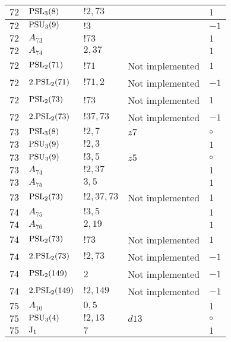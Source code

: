 \documentclass[a4paper, 11pt]{article}
\begin{document}
\begin{longtable}{lllll}
        $ 72 $ & $ {\rm PSL}_{3}(8) $ & $ ! 2,73 $ & $ ~ $ & $ 1$ \\ \hline
        $ 72 $ & $ {\rm PSU}_{3}(9) $ & $ ! 3 $ & $ ~ $ & $ -1$ \\ \hline
        $ 72 $ & $ A_{73} $ & $ !73 $ & $ ~ $ & $ 1$ \\ \hline
        $ 72 $ & $ A_{74} $ & $ 2, 37 $ & $ ~ $ & $ 1$ \\ \hline
        $ 72 $ & $ {\rm PSL}_{2}(71) $ & $ !71 $ &  Not implemented & $ 1$ \\ \hline
        $ 72 $ & $ 2.{\rm PSL}_{2}(71) $ & $ !71, 2 $ &  Not implemented & $ -1$ \\ \hline
        $ 72 $ & $ {\rm PSL}_{2}(73) $ & $ !73 $ &  Not implemented & $ 1$ \\ \hline
        $ 72 $ & $ 2.{\rm PSL}_{2}(73) $ & $ !37, 73 $ &  Not implemented & $ -1$ \\ \hline
        $ 73 $ & $ {\rm PSL}_{3}(8) $ & $ ! 2,7 $ & $ z7 $ &  $\circ$ \\ \hline
        $ 73 $ & $ {\rm PSU}_{3}(9) $ & $ ! 2,3 $ & $ ~ $ & $ 1$ \\ \hline
        $ 73 $ & $ {\rm PSU}_{3}(9) $ & $ ! 3,5 $ & $ z5 $ &  $\circ$ \\ \hline
        $ 73 $ & $ A_{74} $ & $ !2, 37 $ & $ ~ $ & $ 1$ \\ \hline
        $ 73 $ & $ A_{75} $ & $ 3, 5 $ & $ ~ $ & $ 1$ \\ \hline
        $ 73 $ & $ {\rm PSL}_{2}(73) $ & $ !2, 37, 73 $ &  Not implemented & $ 1$ \\ \hline
        $ 74 $ & $ A_{75} $ & $ !3, 5 $ & $ ~ $ & $ 1$ \\ \hline
        $ 74 $ & $ A_{76} $ & $ 2, 19 $ & $ ~ $ & $ 1$ \\ \hline
        $ 74 $ & $ {\rm PSL}_{2}(73) $ & $ !73 $ &  Not implemented & $ 1$ \\ \hline
        $ 74 $ & $ 2.{\rm PSL}_{2}(73) $ & $ !2, 73 $ &  Not implemented & $ -1$ \\ \hline
        $ 74 $ & $ {\rm PSL}_{2}(149) $ & $ 2 $ &  Not implemented & $ -1$ \\ \hline
        $ 74 $ & $ 2.{\rm PSL}_{2}(149) $ & $ !2, 149 $ &  Not implemented & $ -1$ \\ \hline
        $ 75 $ & $ A_{10} $ & $ 0,5 $ & $ ~ $ & $ 1$ \\ \hline
        $ 75 $ & $ {\rm PSU}_{3}(4) $ & $ ! 2,13 $ & $ d13 $ &  $\circ$ \\ \hline
        $ 75 $ & $ {\rm J}_1 $ & $ 7 $ & $ ~ $ & $ 1$ \\ \hline

\end{longtable}
\end{document}
